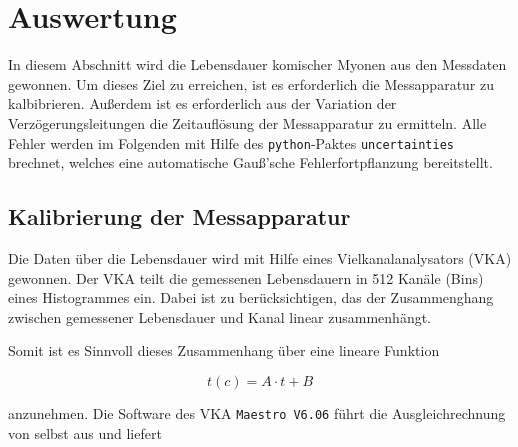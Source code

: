 \section{Auswertung}
\label{sec:evaluation}
In diesem Abschnitt wird die Lebensdauer komischer Myonen aus den Messdaten gewonnen.
Um dieses Ziel zu erreichen, ist es erforderlich die Messapparatur zu kalbibrieren. Außerdem
ist es erforderlich aus der Variation der Verzögerungsleitungen die 
Zeitauflösung der Messapparatur zu ermitteln. Alle Fehler werden im Folgenden mit Hilfe
des \texttt{python}-Paktes \texttt{uncertainties} brechnet, welches eine automatische
Gauß'sche Fehlerfortpflanzung bereitstellt.

\subsection{Kalibrierung der Messapparatur}
\label{subsec:calibration}
Die Daten über die Lebensdauer wird mit Hilfe eines Vielkanalanalysators (VKA) gewonnen.
Der VKA teilt die gemessenen Lebensdauern in \num{512} Kanäle (Bins) eines Histogrammes ein.
Dabei ist zu berücksichtigen, das der Zusammenghang zwischen gemessener Lebensdauer und
Kanal linear zusammenhängt.

Somit ist es Sinnvoll dieses Zusammenhang über eine lineare Funktion

\begin{equation}
t(c) = A \cdot t + B
\end{equation}

anzunehmen. Die Software des VKA \texttt{Maestro V6.06} führt die Ausgleichrechnung von selbst aus
und liefert

